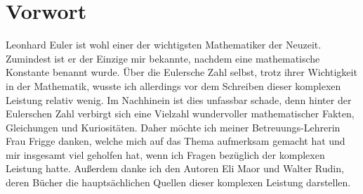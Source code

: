 \section{Vorwort}
Leonhard Euler ist wohl einer der wichtigsten Mathematiker der Neuzeit. Zumindest ist er der Einzige mir bekannte, nachdem eine mathematische Konstante benannt wurde. Über die Eulersche Zahl selbst, trotz ihrer Wichtigkeit in der Mathematik, wusste ich allerdings vor dem Schreiben dieser komplexen Leistung relativ wenig. Im Nachhinein ist dies unfassbar schade, denn hinter der Eulerschen Zahl verbirgt sich eine Vielzahl wundervoller mathematischer Fakten, Gleichungen und Kuriositäten. Daher möchte ich meiner Betreuungs-Lehrerin Frau Frigge danken, welche mich auf das Thema aufmerksam gemacht hat und mir insgesamt viel geholfen hat, wenn ich Fragen bezüglich der komplexen Leistung hatte. Außerdem danke ich den Autoren Eli Maor und Walter Rudin, deren Bücher die hauptsächlichen Quellen dieser komplexen Leistung darstellen.
